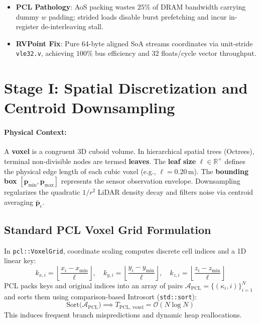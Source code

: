 \documentclass[11pt,a4paper]{article}
\begin{document}
\begin{tcolorbox}[fixcmp, title={Stage Comparison: Memory Layout and Bus Efficiency}]
\begin{itemize}[leftmargin=1.2em, itemsep=0.1em]
    \item \textbf{PCL Pathology}: AoS packing wastes $25\%$ of DRAM bandwidth carrying dummy $w$ padding; strided loads disable burst prefetching and incur in-register de-interleaving stall.
    \item \textbf{RVPoint Fix}: Pure 64-byte aligned SoA streams coordinates via unit-stride \texttt{vle32.v}, achieving $100\%$ bus efficiency and 32 floats/cycle vector throughput.
\end{itemize}
\end{tcolorbox}

\section{Stage I: Spatial Discretization and Centroid Downsampling}
\label{sec:downsample_math}

\paragraph{Physical Context:} A \textbf{voxel} is a congruent 3D cuboid volume. In hierarchical spatial trees (Octrees), terminal non-divisible nodes are termed \textbf{leaves}. The \textbf{leaf size} $\ell \in \mathbb{R}^+$ defines the physical edge length of each cubic voxel (e.g., $\ell = 0.20\,\text{m}$). The \textbf{bounding box} $[\bm{p}_{\min}, \bm{p}_{\max}]$ represents the sensor observation envelope. Downsampling regularizes the quadratic $1/r^2$ LiDAR density decay and filters noise via centroid averaging $\bar{\bm{p}}_c$.

\subsection{Standard PCL Voxel Grid Formulation}
In \texttt{pcl::VoxelGrid}, coordinate scaling computes discrete cell indices and a 1D linear key:
\begin{equation}
k_{x,i} = \left\lfloor \frac{x_i - x_{\min}}{\ell} \right\rfloor, \quad k_{y,i} = \left\lfloor \frac{y_i - y_{\min}}{\ell} \right\rfloor, \quad k_{z,i} = \left\lfloor \frac{z_i - z_{\min}}{\ell} \right\rfloor
\end{equation}
PCL packs keys and original indices into an array of pairs $\mathcal{A}_{\text{PCL}} = \{(\kappa_i, i)\}_{i=1}^N$ and sorts them using comparison-based Introsort (\texttt{std::sort}):
\begin{equation}
\text{Sort}\big( \mathcal{A}_{\text{PCL}} \big) \implies T_{\text{PCL, voxel}} = \mathcal{O}(N \log N)
\label{eq:pcl_voxel_math}
\end{equation}
This induces frequent branch mispredictions and dynamic heap reallocations.
\end{document}
